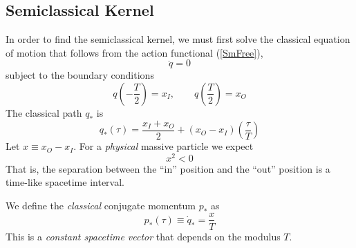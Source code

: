 \subsection{Semiclassical Kernel}
In order to find the semiclassical kernel, we must first solve the classical equation of motion that follows from the action functional (\ref{SmFree}),
\begin{equation}
	\ddot{q} = 0
\end{equation}
subject to the boundary conditions
\begin{equation}
	q\left(- \frac{T}{2} \right) = x_{I}, \qquad q\left( \frac{T}{2} \right) = x_{O}
\end{equation}
The classical path $q_{*}$ is
\begin{equation}
	q_{*}(\tau) = \frac{x_{I} + x_{O}}{2} + (x_{O} - x_{I}) \left( \frac{\tau}{T} \right)
\end{equation}
Let $x \equiv x_{O} - x_{I}$. For a \textit{physical} massive particle we expect
\begin{equation}
	x^{2} < 0
\end{equation}
That is, the separation between the ``in'' position and the ``out'' position is a time-like spacetime interval.

We define the \textit{classical} conjugate momentum $p_{*}$ as
\begin{equation}
	p_{*}(\tau) \equiv \dot{q}_{*} = \frac{x}{T}
\end{equation}
This is a \textit{constant spacetime vector} that depends on the modulus $T$.

